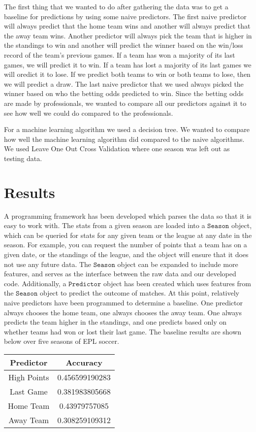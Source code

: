 \documentclass[conference]{IEEEtran}
\begin{document}
The first thing that we wanted to do after gathering the data was to get a baseline for predictions by using some naive predictors. The first naive predictor will always predict that the home team wins and another will always predict that the away team wins. Another predictor will always pick the team that is higher in the standings to win and another will predict the winner based on the win/loss record of the team's previous games. If a team has won a majority of its last games, we will predict it to win. If a team has lost a majority of its last games we will oredict it to lose. If we predict both teams to win or both teams to lose, then we will predict a draw. The last naive predictor that we used always picked the winner based on who the betting odds predicted to win. Since the betting odds are made by professionals, we wanted to compare all our predictors against it to see how well we could do compared to the professionals.

For a machine learning algorithm we used a decision tree. We wanted to compare how well the machine learning algorithm did compared to the naive algorithms. We used Leave One Out Cross Validation where one season was left out as testing data.

\section{Results}
A programming framework has been developed which parses the data so that it is easy to work with. The stats from a given season are loaded into a $\mathtt{Season}$ object, which can be queried for stats for any given team or the league at any date in the season. For example, you can request the number of points that a team has on a given date, or the standings of the league, and the object will ensure that it does not use any future data. The $\mathtt{Season}$ object can be expanded to include more features, and serves as the interface between the raw data and our developed code. Additionally, a $\mathtt{Predictor}$ object has been created which uses features from the $\mathtt{Season}$ object to predict the outcome of matches. At this point, relatively naive predictors have been programmed to determine a baseline. One predictor always chooses the home team, one always chooses the away team. One always predicts the team higher in the standings, and one predicts based only on whether teams had won or lost their last game. The baseline results are shown below over five seasons of EPL soccer.

\begin{center}
  \begin{tabular}{@{} cc @{}}
    \hline
    Predictor & Accuracy \\ 
    \hline
High Points & 0.456599190283 \\ 
    Last Game & 0.381983805668\\ 
    Home Team & 0.43979757085 \\ 
    Away Team & 0.308259109312\\ 
    \hline
  \end{tabular}
\end{center}
\end{document}
